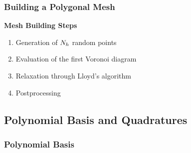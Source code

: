 \begin{frame} %
    \frametitle{Building a Polygonal Mesh}

    \vspace*{\fill}
    \begin{multicols}{2}
        
        \vspace*{\fill}
        \begin{center}
            {\color{\accentcolor} \Large \textbf{Mesh Building Steps}}
            \vspace*{0.5cm}

            \begin{minipage}{0.4\textwidth}
                \begin{enumerate}
                    \item Generation of $N_h$ random points
                    \item Evaluation of the first Voronoi diagram
                    \item Relaxation through Lloyd's algorithm
                    \item {\color{\accentcolor} Postprocessing}
                \end{enumerate}
            \end{minipage}
        \end{center}
        \vspace*{\fill}

        \vfill\null
        \columnbreak

        \vspace*{\fill}
        \begin{figure}[!ht]
            \centering
            
        \end{figure}
        \vspace*{\fill}

    \end{multicols}
    \vspace*{\fill}
    
\end{frame}

\subsection{Polynomial Basis and Quadratures}

\begin{frame}
    \frametitle{Polynomial Basis}

    
\end{frame}

